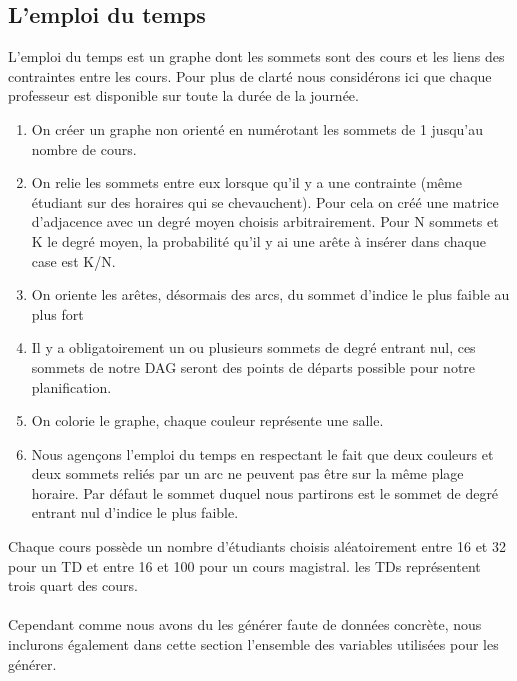 \documentclass[a4paper,11pt]{article}
\begin{document}
	\subsection{L'emploi du temps}
		L'emploi du temps est un graphe dont les sommets sont des cours et les liens des contraintes entre les cours.
		Pour plus de clarté nous considérons ici que chaque professeur est disponible sur toute la durée de la journée.
		\begin{enumerate}
			\item On créer un graphe non orienté en numérotant les sommets de 1 jusqu'au nombre de cours.
			\item On relie les sommets entre eux lorsque qu'il y a une contrainte (même étudiant sur des horaires qui se chevauchent). Pour cela on créé une matrice d'adjacence avec un degré moyen choisis arbitrairement. Pour N sommets et K le degré moyen, la probabilité qu'il y ai une arête à insérer dans chaque case est K/N.
			\item On oriente les arêtes, désormais des arcs, du  sommet d'indice le plus faible au plus fort
			\item Il y a obligatoirement un ou plusieurs sommets de degré entrant nul, ces sommets de notre DAG seront des points de départs possible pour notre planification.
			\item On colorie le graphe, chaque couleur représente une salle.		
			\item Nous agençons l'emploi du temps en respectant le fait que deux couleurs et deux sommets reliés par un arc ne peuvent pas être sur la même plage horaire. Par défaut le sommet duquel nous partirons est le sommet de degré entrant nul d'indice le plus faible.
		\end{enumerate}
		Chaque cours possède un nombre d'étudiants choisis aléatoirement entre 16 et 32 pour un TD et entre 16 et 100 pour un cours magistral. les TDs représentent trois quart des cours.\\
		\\	
		Cependant comme nous avons du les générer faute de données concrète, nous inclurons également dans cette section l'ensemble des variables utilisées pour les générer.
\end{document}
